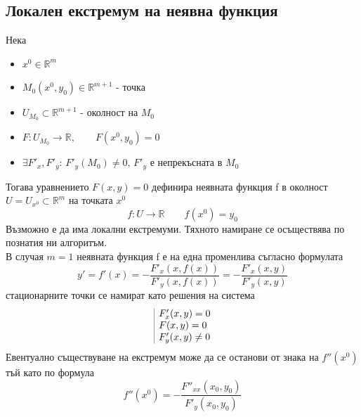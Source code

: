 \documentclass[a4paper,fleqn,12pt]{article}
\theoremstyle{definition}
\begin{document}
\subsection{Локален екстремум на неявна функция}
Нека
\begin{itemize}
\item $x^0 \in \mathbb{R}^m$
\item $M_0 (x^0,y_0) \in \mathbb{R}^{m+1}$ -  точка 
\item $U_{M_0} \subset \mathbb{R}^{m+1}$ - околност на $M_0$
\item $F: U_{M_0} \to \mathbb{R}, \qquad F(x^0,y_0) = 0 $
\item $\exists F'_x, F'_y: \, F'_y(M_0) \neq 0, \,F'_y$ е непрекъсната в $M_0$ 
\end{itemize}
Тогава уравнението $F(x,y) = 0$ дефинира неявната функция f в околност $U = U_{x^0} \subset \mathbb{R}^m$ на точката $x^0$ 
$$f: U \to \mathbb{R} \qquad f(x^0) = y_0$$
Възможно е да има локални екстремуми. Тяхното намиране се осъществява по познатия ни алгоритъм. \\
В случая $m = 1$ неявната функция f е на една променлива съгласно формулата 
$$y' = f'(x) = - \dfrac{F'_x(x,f(x))}{F'_y(x,f(x))} = - \dfrac{F'_x(x,y)}{F'_y(x,y)}$$
стационарните точки се намират като решения на система
$$
\begin{array}{|l@{}}
F'_x(x,y) = 0 \\ 
F (x,y) = 0 \\ 
F'_y(x,y) \neq 0
\end{array}$$
Евентуално съществуване на екстремум може да се останови от знака на $f''(x^0)$ тъй като по формула 
$$f''(x^0) = - \dfrac{F''_{xx} (x_0,y_0)}{F'_y (x_0,y_0)}$$
\end{document}
